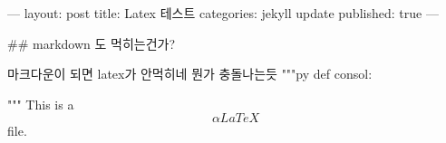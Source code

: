 ---
layout: post
title:  Latex 테스트
categories: jekyll update
published: true
---

## markdown 도 먹히는건가?

마크다운이 되면 latex가 안먹히네 뭔가 충돌나는듯
"""py
def consol:

"""
This is a $$\alpha{LaTeX}$$ file.